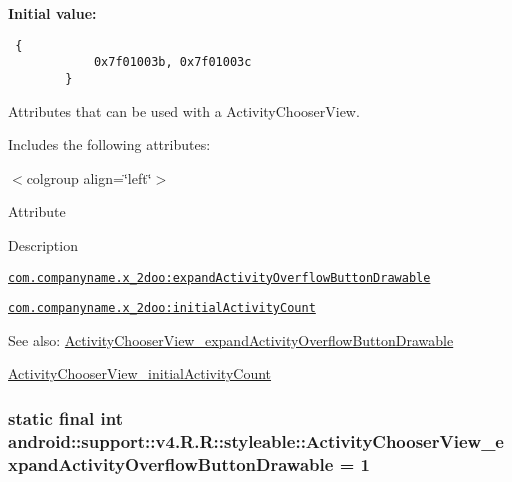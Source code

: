 \textbf{Initial value:}

\begin{Code}\begin{verbatim} {
            0x7f01003b, 0x7f01003c
        }
\end{verbatim}
\end{Code}
Attributes that can be used with a ActivityChooserView. 

Includes the following attributes: \begin{TabularC}{0}
\hline
\end{TabularC}
$<$colgroup align=\char`\"{}left\char`\"{}$>$ 

Attribute

Description 

{\tt \hyperlink{classandroid_1_1support_1_1v4_1_1_r_1_1styleable_912d1bd867727cff83bd6c5fb2f6ffd3}{com.companyname.x\_\-2doo:expandActivityOverflowButtonDrawable}}

{\tt \hyperlink{classandroid_1_1support_1_1v4_1_1_r_1_1styleable_1bbab56b57a1d4dbf1b6419979ba355b}{com.companyname.x\_\-2doo:initialActivityCount}}

\begin{Desc}
\item[See also:]\hyperlink{classandroid_1_1support_1_1v4_1_1_r_1_1styleable_912d1bd867727cff83bd6c5fb2f6ffd3}{ActivityChooserView\_\-expandActivityOverflowButtonDrawable} 

\hyperlink{classandroid_1_1support_1_1v4_1_1_r_1_1styleable_1bbab56b57a1d4dbf1b6419979ba355b}{ActivityChooserView\_\-initialActivityCount} \end{Desc}
\hypertarget{classandroid_1_1support_1_1v4_1_1_r_1_1styleable_912d1bd867727cff83bd6c5fb2f6ffd3}{
\subsubsection[{ActivityChooserView\_\-expandActivityOverflowButtonDrawable}]{\setlength{\rightskip}{0pt plus 5cm}static final int android::support::v4.R.R::styleable::ActivityChooserView\_\-expandActivityOverflowButtonDrawable = 1}}
\label{classandroid_1_1support_1_1v4_1_1_r_1_1styleable_912d1bd867727cff83bd6c5fb2f6ffd3}


